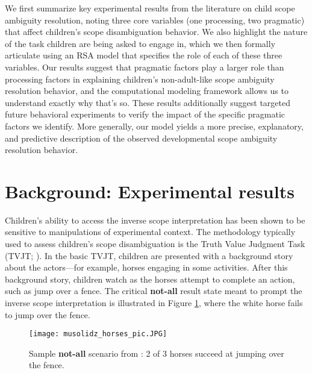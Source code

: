 \documentclass[10pt,a4paper]{article}
\newcommand{\gcs}[1]{\textcolor{blue}{[gcs: #1]}}
\newcommand{\lsp}[1]{\textcolor{violet}{[lsp: #1]}}
\begin{document}
We first summarize key experimental results from the literature on child scope ambiguity resolution, noting three core variables (one processing, two pragmatic) that affect children's scope disambiguation behavior. We also highlight the nature of the task children are being asked to engage in, 
which we then formally articulate using an RSA model that specifies the role of each of these three variables.
Our results suggest that pragmatic factors play a larger role than processing factors in explaining children's non-adult-like scope ambiguity resolution behavior, 
and the computational modeling framework allows us to understand exactly why that's so. %
These results additionally suggest targeted future behavioral experiments to verify the impact of the specific pragmatic factors we identify.  
More generally, our model yields a more precise, explanatory, and predictive description of the observed developmental scope ambiguity resolution behavior.


\section{Background: Experimental results}

Children's ability to access the inverse scope interpretation has been shown to be sensitive to manipulations of experimental context.
The methodology typically used to assess children's scope disambiguation is the Truth Value Judgment Task (TVJT; ).  In the basic TVJT, children are presented with a background story about the actors---for example, horses engaging in some activities.  After this background story, children watch as the horses attempt to complete an action, such as jump over a fence. The critical \textbf{not-all} result state meant to prompt the inverse scope interpretation is illustrated in Figure \ref{fig:horse}, where the white horse fails to jump over the fence. 

\begin{figure}[!ht]
\begin{center}
\texttt{[image: musolidz\_horses\_pic.JPG]}
\caption{Sample \textbf{not-all} scenario from : 2 of 3 horses succeed at jumping over the fence.}
\label{fig:horse}
\end{center}
\end{figure}
\end{document}
